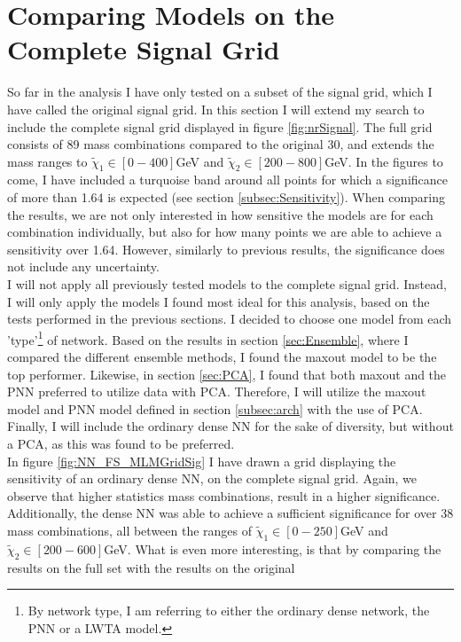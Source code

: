 \section{Comparing Models on the Complete Signal Grid}\label{sec:FS}
So far in the analysis I have only tested on a subset of the signal grid, which I have called the original signal grid. In this section 
I will extend my search to include the complete signal grid displayed in figure \ref{fig:nrSignal}. The full grid consists of 89 mass 
combinations compared to the original 30, and extends the mass ranges to $\tilde{\chi}_1 \in [0-400]$GeV and $\tilde{\chi}_2 \in [200-800]$GeV.
In the figures to come, I have included a turquoise band around all points for which a significance of more than 1.64 is expected (see section \ref{subsec:Sensitivity}).
When comparing the results, we are not only interested in how sensitive the models are for each combination individually, but also for how many points we are 
able to achieve a sensitivity over 1.64. However, similarly to previous results, the significance does not include any uncertainty.
\\
I will not apply all previously tested models to the complete signal grid. Instead, I will only apply the models I found most ideal for this analysis, based 
on the tests performed in the previous sections. I decided to choose one model from each 'type'\footnote{By network type, I am referring to either the ordinary dense network, the 
\ac{PNN} or a \ac{LWTA} model. } of network. Based on the results in section \ref{sec:Ensemble}, where I compared the different ensemble methods, I found the maxout model to be 
the top performer. Likewise, in section \ref{sec:PCA}, I found that both maxout and the \ac{PNN} preferred to utilize data with \ac{PCA}. Therefore, I will utilize the maxout model 
and \ac{PNN} model defined in section \ref{subsec:arch} with the use of \ac{PCA}. Finally, I will include the ordinary dense \ac{NN} for the sake of diversity, but without a \ac{PCA}, 
as this was found to be preferred.
\\
In figure \ref{fig:NN_FS_MLMGridSig} I have drawn a grid displaying the sensitivity of an ordinary dense \ac{NN}, on the complete signal grid. Again, we observe that higher statistics
mass combinations, result in a higher significance. Additionally, the dense \ac{NN} was able to achieve a sufficient significance for over 38 mass combinations, all between the ranges of 
$\tilde{\chi}_1 \in [0-250]$GeV and $\tilde{\chi}_2 \in [200-600]$GeV. What is even more interesting, is that by comparing the results on the full set with the results on the original 
